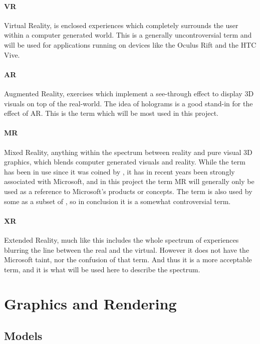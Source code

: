 \paragraph*{VR}\label{para:vr} Virtual Reality, is enclosed experiences which completely surrounds the user within a computer generated world. This is a generally uncontroversial term and will be used for applications running on devices like the Oculus Rift and the HTC Vive.

\paragraph*{AR}\label{para:ar} Augmented Reality, exercises which implement a see-through effect to display 3D visuals on top of the real-world. The idea of holograms is a good stand-in for the effect of AR. This is the term which will be most used in this project. 

\paragraph*{MR}\label{para:mr} Mixed Reality, anything within the spectrum between reality and pure visual 3D graphics, which blends computer generated visuals and reality. While the term has been in use since it was coined by \citet{Milgram1994}, it has in recent years been strongly associated with Microsoft, and in this project the term MR will generally only be used as a reference to Microsoft's products or concepts. The term is also used by some as a subset of , so in conclusion it is a somewhat controversial term. 


\paragraph*{XR}\label{para:xr} Extended Reality, much like  this includes the whole spectrum of experiences blurring the line between the real and the virtual. However it does not have the Microsoft taint, nor the confusion of that term. And thus it is a more acceptable term, and it is what will be used here to describe the spectrum.


\section{Graphics and Rendering}

\subsection*{Models}

